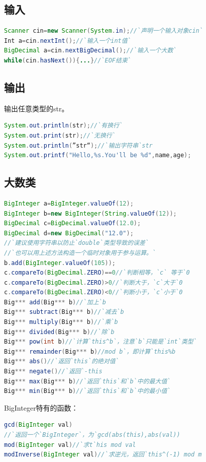 \documentclass[UTF8,a4paper,titlepage]{ctexart}
\begin{document}
\subsection{输入}
\begin{lstlisting}[language=Java]
Scanner cin=new Scanner(System.in);//`声明一个输入对象cin`
Int a=cin.nextInt();//`输入一个int值`
BigDecimal a=cin.nextBigDecimal();//`输入一个大数`
while(cin.hasNext()){...}//`EOF结束`
\end{lstlisting}
\subsection{输出}
输出任意类型的str。
\begin{lstlisting}[language=Java]
System.out.println(str);//`有换行`
System.out.print(str);//`无换行`
System.out.println(”str“);//`输出字符串`str
System.out.printf("Hello,%s.You'll be %d",name,age);
\end{lstlisting}
\subsection{大数类}
\begin{lstlisting}[language=Java]
BigInteger a=BigInteger.valueOf(12);
BigInteger b=new BigInteger(String.valueOf(12));
BigDecimal c=BigDecimal.valueOf(12.0);
BigDecimal d=new BigDecimal("12.0");
//`建议使用字符串以防止`double`类型导致的误差`
//`也可以用上述方法构造一个临时对象用于参与运算。`
b.add(BigInteger.valueOf(105));
c.compareTo(BigDecimal.ZERO)==0//`判断相等，`c` 等于`0
c.compareTo(BigDecimal.ZERO)>0//`判断大于，`c`大于`0
c.compareTo(BigDecimal.ZERO)<0//`判断小于，`c`小于`0
Big*** add(Big*** b)//`加上`b
Big*** subtract(Big*** b)//`减去`b
Big*** multiply(Big*** b)//`乘`b
Big*** divided(Big*** b)//`除`b
Big*** pow(int b)//`计算`this^b`，注意`b`只能是`int`类型`
Big*** remainder(Big*** b)//mod b`，即计算`this%b
Big*** abs()//`返回`this`的绝对值`
Big*** negate()//`返回`-this
Big*** max(Big*** b)//`返回`this`和`b`中的最大值`
Big*** min(Big*** b)//`返回`this`和`b`中的最小值`
\end{lstlisting}
BigInteger特有的函数：
\begin{lstlisting}[language=Java]
gcd(BigInteger val)
//`返回一个`BigInteger`，为`gcd(abs(this),abs(val))
mod(BigInteger val)//`求t`his mod val
modInverse(BigInteger val)//`求逆元，返回`this^(-1) mod m
\end{lstlisting}
\end{document}

